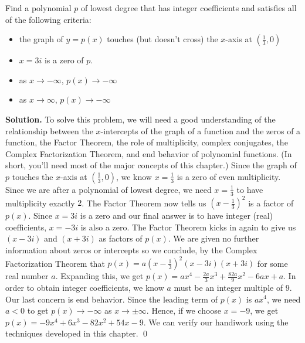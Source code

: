 \begin{ex}  Find a polynomial $p$ of lowest degree that has integer coefficients and satisfies all of the following criteria:

\begin{itemize}

\item  the graph of $y=p(x)$ touches (but doesn't cross) the $x$-axis at $\left(\frac{1}{3}, 0\right)$

\item  $x=3i$ is a zero of $p$.

\item  as $x \rightarrow -\infty$, $p(x) \rightarrow -\infty$

\item  as $x \rightarrow \infty$, $p(x) \rightarrow -\infty$


\end{itemize}

{\bf Solution.}  To solve this problem, we will need a good understanding of the relationship between the $x$-intercepts of the graph of a function and the zeros of a function, the Factor Theorem, the role of multiplicity, complex conjugates, the Complex Factorization Theorem, and end behavior of polynomial functions.  (In short, you'll need most of the major concepts of this chapter.)  Since the graph of $p$ touches the $x$-axis at $\left(\frac{1}{3}, 0\right)$, we know $x=\frac{1}{3}$ is a zero of even multiplicity.  Since we are after a polynomial of lowest degree, we need $x=\frac{1}{3}$ to have multiplicity exactly $2$. The Factor Theorem now tells us  $\left(x-\frac{1}{3}\right)^2$ is a factor of $p(x)$.  Since $x=3i$ is a zero and our final answer is to have integer (real) coefficients, $x=-3i$ is also a zero.  The Factor Theorem kicks in again to give us $(x-3i)$ and $(x+3i)$ as factors of $p(x)$.  We are given no further information about zeros or intercepts so we conclude, by the Complex Factorization Theorem that $p(x) = a \left(x-\frac{1}{3}\right)^2 (x-3i)(x+3i)$ for some real number $a$.  Expanding this, we get $p(x) =  ax^4-\frac{2a}{3} x^3+\frac{82a}{9} x^2-6ax+a$.  In order to obtain integer coefficients, we know $a$ must be an integer multiple of $9$.  Our last concern is end behavior.  Since the leading term of $p(x)$ is $ax^4$, we need $a < 0$ to get $p(x) \rightarrow -\infty$ as $x \rightarrow \pm \infty$. Hence, if we choose $x=-9$, we get $p(x) = -9x^4+ 6 x^3 - 82 x^2+54x-9$.    We can verify our handiwork using the techniques developed in this chapter.  \qed

\end{ex}

